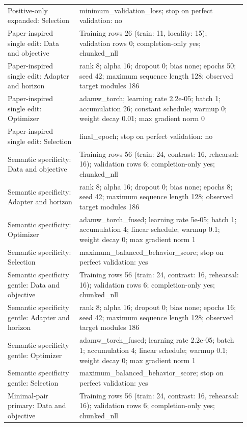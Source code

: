\begin{longtable}{p{0.28\linewidth}p{0.65\linewidth}}
Positive-only expanded: Selection & minimum\_validation\_loss; stop on perfect validation: no \\
Paper-inspired single edit: Data and objective & Training rows 26 (train: 11, locality: 15); validation rows 0; completion-only yes; chunked\_nll \\
Paper-inspired single edit: Adapter and horizon & rank 8; alpha 16; dropout 0; bias none; epochs 50; seed 42; maximum sequence length 128; observed target modules 186 \\
Paper-inspired single edit: Optimizer & adamw\_torch; learning rate 2.2e-05; batch 1; accumulation 26; constant schedule; warmup 0; weight decay 0.01; max gradient norm 0 \\
Paper-inspired single edit: Selection & final\_epoch; stop on perfect validation: no \\
Semantic specificity: Data and objective & Training rows 56 (train: 24, contrast: 16, rehearsal: 16); validation rows 6; completion-only yes; chunked\_nll \\
Semantic specificity: Adapter and horizon & rank 8; alpha 16; dropout 0; bias none; epochs 8; seed 42; maximum sequence length 128; observed target modules 186 \\
Semantic specificity: Optimizer & adamw\_torch\_fused; learning rate 5e-05; batch 1; accumulation 4; linear schedule; warmup 0.1; weight decay 0; max gradient norm 1 \\
Semantic specificity: Selection & maximum\_balanced\_behavior\_score; stop on perfect validation: yes \\
Semantic specificity gentle: Data and objective & Training rows 56 (train: 24, contrast: 16, rehearsal: 16); validation rows 6; completion-only yes; chunked\_nll \\
Semantic specificity gentle: Adapter and horizon & rank 8; alpha 16; dropout 0; bias none; epochs 16; seed 42; maximum sequence length 128; observed target modules 186 \\
Semantic specificity gentle: Optimizer & adamw\_torch\_fused; learning rate 2.2e-05; batch 1; accumulation 4; linear schedule; warmup 0.1; weight decay 0; max gradient norm 1 \\
Semantic specificity gentle: Selection & maximum\_balanced\_behavior\_score; stop on perfect validation: yes \\
Minimal-pair primary: Data and objective & Training rows 56 (train: 24, contrast: 16, rehearsal: 16); validation rows 6; completion-only yes; chunked\_nll \\

\end{longtable}
